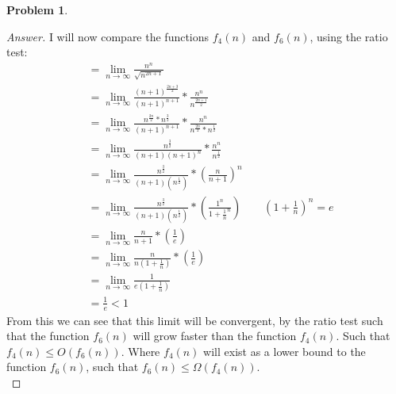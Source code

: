 \documentclass[11pt]{article}
\theoremstyle{definition}
\theoremstyle{definition}
\newtheorem{required}{Problem}
\theoremstyle{definition}
\begin{document}
\begin{required}
\begin{enumerate}[label=(\alph*)]
\begin{proof}[Answer]
I will now compare the functions $f_4(n)$ and $f_6(n)$, using the ratio test: \\
\begin{align*}
&= \lim_{n \to \infty} \frac{n^{n}}{\sqrt {n^{2n+1}}} \\
&= \lim_{n \to \infty} \frac{(n+1)^{\frac{2n+3}{2}}}{(n+1)^{n+1}} * \frac{n^n}{n^{\frac{2n+1}{2}}}\\
&= \lim_{n \to \infty} \frac{n^{\frac{2n}{2}}*n^{\frac{3}{2}}}{(n+1)^{n+1}} * \frac{n^{n}}{n^{\frac{2n}{2}}*n^{\frac{1}{2}}} \\
&= \lim_{n \to \infty} \frac{n^{\frac{3}{2}}}{(n+1)(n+1)^{n}} * \frac{n^{n}}{n^{\frac{1}{2}}} \\
&= \lim_{n \to \infty} \frac{n^{\frac{3}{2}}}{(n+1)(n^{\frac{1}{2}})} * (\frac{n}{n+1})^{n} \\ 
&= \lim_{n \to \infty} \frac{n^{\frac{3}{2}}}{(n+1)(n^{\frac{1}{2}})} * (\frac{1^{n}}{1+\frac{1}{n}^{n}}) \qquad (1+\frac{1}{n})^{n} = e \\
&= \lim_{n \to \infty} \frac{n}{n+1} * (\frac{1}{e}) \\
&= \lim_{n \to \infty} \frac{n}{n(1+\frac{1}{n})} * (\frac{1}{e}) \\
&= \lim_{n \to \infty} \frac{1}{e(1+\frac{1}{n})} \\
&= \frac{1}{e} < 1
\end{align*}
From this we can see that this limit will be convergent, by the ratio test such that the function $f_6(n)$ will grow faster than the function $f_4(n)$. Such that $f_4(n) \leq O(f_6(n))$. Where $f_4(n)$ will exist as a lower bound to the function $f_6(n)$, such that  $f_6(n) \leq \Omega(f_4(n))$. \\


\end{proof}
\end{enumerate}
\end{required}
\end{document}
